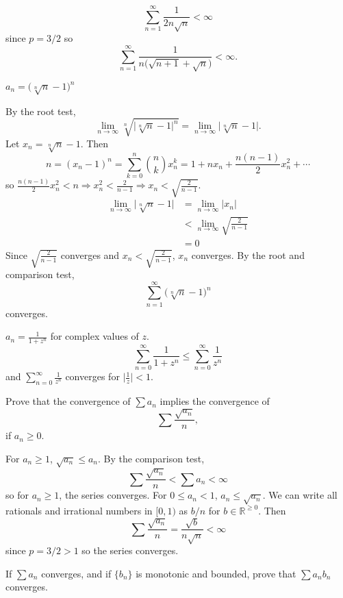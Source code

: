 \begin{exercise}
\begin{exercise}[label = (\alph*)]
\[    \sum_{n = 1}^{\infty}\frac{1}{2n\sqrt{n}} < \infty
    \]
    since \(p = 3/2\) so
    \[
    \sum_{n = 1}^{\infty}\frac{1}{n\bigl(\sqrt{n + 1} + \sqrt{n}\bigr)} <
    \infty.
    \]
  \item
    \(a_n = \bigl(\sqrt[n]{n} - 1\bigr)^n\)
    \par\smallskip
    By the root test,
    \[
    \lim_{n\to\infty}\sqrt[n]{\lvert\sqrt[n]{n} - 1\rvert^n} =
    \lim_{n\to\infty}\lvert\sqrt[n]{n} - 1\rvert.
    \]
    Let \(x_n = \sqrt[n]{n} - 1\).
    Then
    \[
    n = (x_n - 1)^n = \sum_{k = 0}^n\binom{n}{k}x_n^k = 1 + nx_n +
    \frac{n(n-1)}{2}x_n^2 + \cdots
    \]
    so \(\frac{n(n-1)}{2}x_n^2 < n\Rightarrow x_n^2 < \frac{2}{n - 1}
    \Rightarrow x_n < \sqrt{\frac{2}{n - 1}}\).
    \begin{align*}
      \lim_{n\to\infty}\lvert\sqrt[n]{n} - 1\rvert
      & = \lim_{n\to\infty}\lvert x_n\rvert\\
      & < \lim_{n\to\infty}\sqrt{\frac{2}{n - 1}}\\
      & = 0
    \end{align*}
    Since \(\sqrt{\frac{2}{n - 1}}\) converges and
    \(x_n < \sqrt{\frac{2}{n - 1}}\), \(x_n\) converges.
    By the root and comparison test,
    \[
    \sum_{n = 1}^{\infty}\bigl(\sqrt[n]{n} - 1\bigr)^n
    \]
    converges.
  \item
    \(a_n = \frac{1}{1 + z^n}\) for complex values of \(z\).
    \[
    \sum_{n = 0}^{\infty}\frac{1}{1 + z^n}\leq
    \sum_{n = 0}^{\infty}\frac{1}{z^n}
    \]
    and \(\sum_{n = 0}^{\infty}\frac{1}{z^n}\) converges for
    \(\bigl\lvert\frac{1}{z}\bigr\rvert < 1\).
  \end{exercise}
\item
  Prove that the convergence of \(\sum a_n\) implies the convergence of
  \[
  \sum\frac{\sqrt{a_n}}{n},
  \]
  if \(a_n\geq 0\).
  \par\smallskip
  For \(a_n\geq 1\), \(\sqrt{a_n}\leq a_n\).
  By the comparison test,
  \[
  \sum\frac{\sqrt{a_n}}{n} < \sum a_n < \infty
  \]
  so for \(a_n\geq 1\), the series converges.
  For \(0\leq a_n < 1\), \(a_n\leq\sqrt{a_n}\).
  We can write all rationals and irrational numbers in \([0,1)\) as \(b/n\)
  for \(b\in\mathbb{R}^{\geq 0}\).
  Then
  \[
  \sum\frac{\sqrt{a_n}}{n} = \frac{\sqrt{b}}{n\sqrt{n}} < \infty
  \]
  since \(p = 3/2 > 1\) so the series converges.
\item
  If \(\sum a_n\) converges, and if \(\{b_n\}\) is monotonic and bounded,
  prove that \(\sum a_nb_n\) converges.
  \par\smallskip

\end{exercise}
